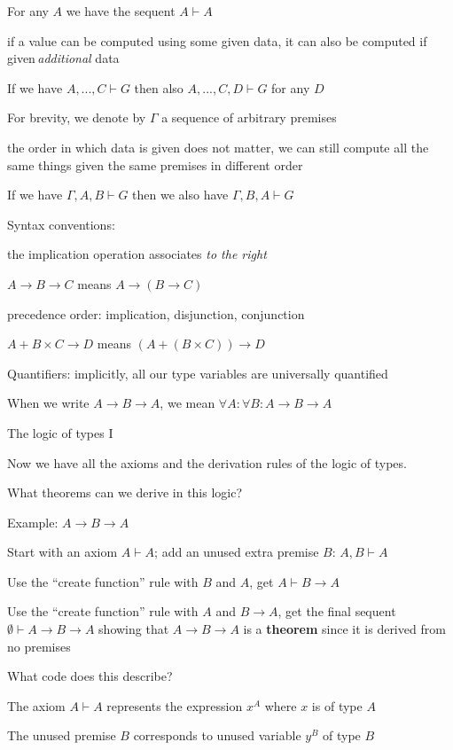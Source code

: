 For any $A$ we have the sequent $A\vdash A$

if a value can be computed using some given data, it can also be computed
if given\,\emph{additional} data

If we have $A,...,C\vdash G$ then also $A,...,C,D\vdash G$ for any
$D$

For brevity, we denote by $\Gamma$ a sequence of arbitrary premises

the order in which data is given does not matter, we can still compute
all the same things given the same premises in different order

If we have $\Gamma,A,B\vdash G$ then we also have $\Gamma,B,A\vdash G$

Syntax conventions:

the implication operation associates \emph{to the right}

$A\rightarrow B\rightarrow C$ means $A\rightarrow\left(B\rightarrow C\right)$

precedence order: implication, disjunction, conjunction

$A+B\times C\rightarrow D$ means $\left(A+\left(B\times C\right)\right)\rightarrow D$

Quantifiers: implicitly, all our type variables are universally quantified

When we write $A\rightarrow B\rightarrow A$, we mean $\forall A:\forall B:A\rightarrow B\rightarrow A$

The logic of types I

Now we have all the axioms and the derivation rules of the logic of
types.

What theorems can we derive in this logic?

Example: $A\rightarrow B\rightarrow A$

Start with an axiom $A\vdash A$; add an unused extra premise $B$:
$A,B\vdash A$

Use the ``create function'' rule with $B$ and $A$, get $A\vdash B\rightarrow A$

Use the ``create function'' rule with $A$ and $B\rightarrow A$,
get the final sequent $\emptyset\vdash A\rightarrow B\rightarrow A$
showing that $A\rightarrow B\rightarrow A$ is a \textbf{theorem}
since it is derived from no premises

What code does this describe?

The axiom $A\vdash A$ represents the expression $x^{A}$ where $x$
is of type $A$

The unused premise $B$ corresponds to unused variable $y^{B}$ of
type $B$

